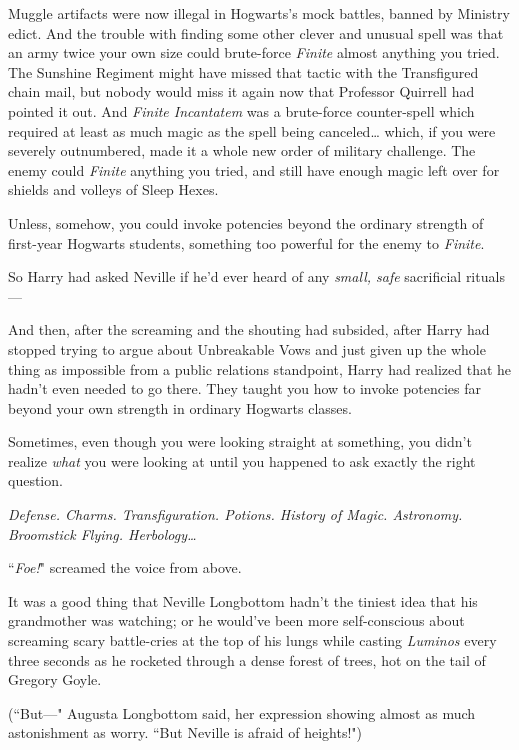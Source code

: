 Muggle artifacts were now illegal in Hogwarts's mock battles, banned by Ministry edict. And the trouble with finding some other clever and unusual spell was that an army twice your own size could brute-force \emph{Finite} almost anything you tried. The Sunshine Regiment might have missed that tactic with the Transfigured chain mail, but nobody would miss it again now that Professor Quirrell had pointed it out. And \emph{Finite Incantatem} was a brute-force counter-spell which required at least as much magic as the spell being canceled{\ldots} which, if you were severely outnumbered, made it a whole new order of military challenge. The enemy could \emph{Finite} anything you tried, and still have enough magic left over for shields and volleys of Sleep Hexes.

Unless, somehow, you could invoke potencies beyond the ordinary strength of first-year Hogwarts students, something too powerful for the enemy to \emph{Finite}.

So Harry had asked Neville if he'd ever heard of any \emph{small, safe} sacrificial rituals—

And then, after the screaming and the shouting had subsided, after Harry had stopped trying to argue about Unbreakable Vows and just given up the whole thing as impossible from a public relations standpoint, Harry had realized that he hadn't even needed to go there. They taught you how to invoke potencies far beyond your own strength in ordinary Hogwarts classes.

Sometimes, even though you were looking straight at something, you didn't realize \emph{what} you were looking at until you happened to ask exactly the right question.

\emph{Defense. Charms. Transfiguration. Potions. History of Magic. Astronomy. Broomstick Flying. Herbology{\ldots}}

``\emph{Foe!}" screamed the voice from above.

\later

It was a good thing that Neville Longbottom hadn't the tiniest idea that his grandmother was watching; or he would've been more self-conscious about screaming scary battle-cries at the top of his lungs while casting \emph{Luminos} every three seconds as he rocketed through a dense forest of trees, hot on the tail of Gregory Goyle.

(``But—" Augusta Longbottom said, her expression showing almost as much astonishment as worry. ``But Neville is afraid of heights!")

